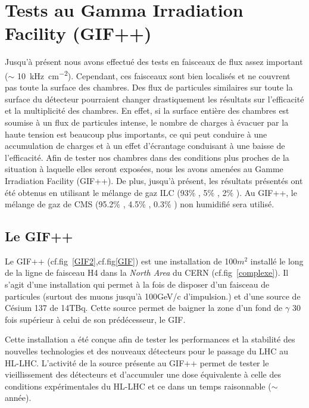 \section {Tests au Gamma Irradiation Facility (GIF++)}
Jusqu'à présent nous avons effectué des tests en faisceaux de flux assez important ($\sim$ \SI{10}{\kilo\hertz\per\square\centi\meter}). Cependant, ces faisceaux sont bien localisés et ne couvrent pas toute la surface des chambres. Des flux de particules similaires sur toute la surface du détecteur pourraient changer drastiquement les résultats sur l'efficacité et la multiplicité des chambres. En effet, si la surface entière des chambres est soumise à un flux de particules intense, le nombre de charges à évacuer par la haute tension est beaucoup plus importants, ce qui peut conduire à une accumulation de charges et à un effet d'écrantage conduisant à une baisse de l'efficacité. Afin de tester nos chambres dans des conditions plus proches de la situation à laquelle elles seront exposées, nous les avons amenées au Gamme Irradiation Facility (GIF++). De plus, jusqu'à présent, les résultats présentés ont été obtenus en utilisant le mélange de gaz ILC (93\% , 5\% , 2\% ). Au GIF++, le mélange de gaz de CMS (95.2\% , 4.5\% , 0.3\% ) non humidifié sera utilisé.

\subsection{Le GIF++}
Le GIF++ \cite{Jakel:1977147} (cf.fig~\ref{GIF2},cf.fig\ref{GIF}) est une installation de 100$m^2$ installé le long de la ligne de faisceau H4 dans la \textit{North Area} du CERN (cf.fig~\ref{complexe}). Il s'agit d'une installation qui permet à la fois de disposer d'un faisceau de particules (surtout des muons jusqu'à 100GeV/c d'impulsion.) et d'une source de Césium 137 de 14TBq. Cette source permet de baigner la zone d'un fond de $\gamma$ 30 fois supérieur à celui de son prédécesseur, le GIF.

Cette installation a été conçue afin de tester les performances et la stabilité des nouvelles technologies et des nouveaux détecteurs pour le passage du LHC au HL-LHC. L'activité de la source présente au GIF++ permet de tester le vieillissement des détecteurs et d'accumuler une dose équivalente à celle des conditions expérimentales du HL-LHC et ce dans un temps raisonnable ($\sim$ année). 

